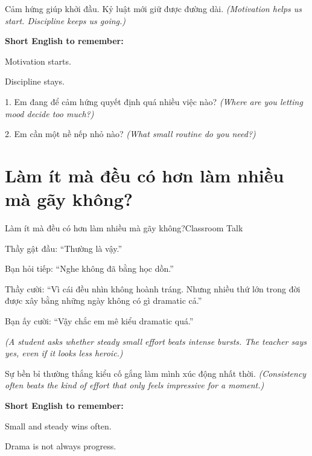\begin{baihoc}
Cảm hứng giúp khởi đầu. Kỷ luật mới giữ được đường dài.
\textit{(Motivation helps us start. Discipline keeps us going.)}
\end{baihoc}

\begin{ghinhoanh}
\textbf{Short English to remember:}

Motivation starts.

Discipline stays.
\end{ghinhoanh}

\begin{tuhocnhanh}
1. Em đang để cảm hứng quyết định quá nhiều việc nào? \textit{(Where are you letting mood decide too much?)}

2. Em cần một nề nếp nhỏ nào? \textit{(What small routine do you need?)}
\end{tuhocnhanh}
\ngancach

\section{Làm ít mà đều có hơn làm nhiều mà gãy không?}
\begin{truyen}{Làm ít mà đều có hơn làm nhiều mà gãy không?}{Classroom Talk}

Thầy gật đầu: ``Thường là vậy.''

Bạn hỏi tiếp: ``Nghe không đã bằng học dồn.''

Thầy cười: ``Vì cái đều nhìn không hoành tráng. Nhưng nhiều thứ lớn trong đời được xây bằng những ngày không có gì dramatic cả.''

Bạn ấy cười: ``Vậy chắc em mê kiểu dramatic quá.''

\textit{(A student asks whether steady small effort beats intense bursts. The teacher says yes, even if it looks less heroic.)}
\end{truyen}

\begin{baihoc}
Sự bền bỉ thường thắng kiểu cố gắng làm mình xúc động nhất thời.
\textit{(Consistency often beats the kind of effort that only feels impressive for a moment.)}
\end{baihoc}

\begin{ghinhoanh}
\textbf{Short English to remember:}

Small and steady wins often.

Drama is not always progress.
\end{ghinhoanh}


